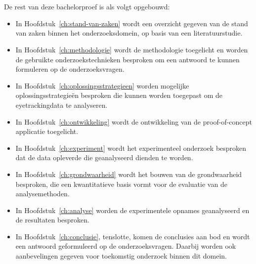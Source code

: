 \section{}%
\label{sec:opzet-bachelorproef}


De rest van deze bachelorproef is als volgt opgebouwd:
\begin{itemize}
  \item In Hoofdstuk~\ref{ch:stand-van-zaken} wordt een overzicht gegeven van de stand van zaken binnen het onderzoeksdomein, op basis van een literatuurstudie.
  \item In Hoofdstuk~\ref{ch:methodologie} wordt de methodologie toegelicht en worden de gebruikte onderzoekstechnieken besproken om een antwoord te kunnen formuleren op de onderzoeksvragen.
  \item In Hoofdstuk~\ref{ch:oplossingsstrategieen} worden mogelijke oplossingsstrategieën besproken die kunnen worden toegepast om de eyetrackingdata te analyseren.
  \item In Hoofdstuk~\ref{ch:ontwikkeling} wordt de ontwikkeling van de proof-of-concept applicatie toegelicht.
  \item In Hoofdstuk~\ref{ch:experiment} wordt het experimenteel onderzoek besproken dat de data opleverde die geanalyseerd dienden te worden.
  \item In Hoofdstuk~\ref{ch:grondwaarheid} wordt het bouwen van de grondwaarheid besproken, die een kwantitatieve basis vormt voor de evaluatie van de analysemethoden.
  \item In Hoofdstuk~\ref{ch:analyse} worden de experimentele opnames geanalyseerd en de resultaten besproken.
  \item In Hoofdstuk~\ref{ch:conclusie}, tenslotte, komen de conclusies aan bod en wordt een antwoord geformuleerd op de onderzoeksvragen. Daarbij worden ook aanbevelingen gegeven voor toekomstig onderzoek binnen dit domein.
\end{itemize}
